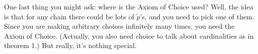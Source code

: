 One last thing you might ask:
where is the Axiom of Choice used?
Well, the idea is that for any chain there could be lots of $\tilde p$'s,
and you need to pick one of them.
Since you are making arbitrary choices infinitely many times, you need the Axiom of Choice.
(Actually, you also need choice to talk about cardinalities as in theorem 1.)
But really, it's nothing special.
